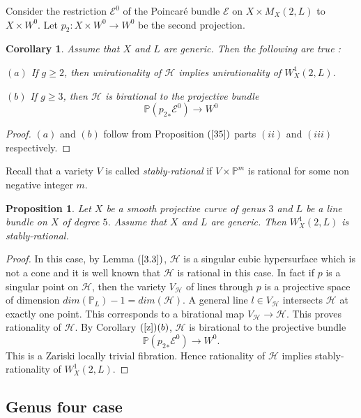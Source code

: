 \documentclass[12pt, reqno]{amsart}
\newtheorem{proposition}[theorem]{Proposition}
\newtheorem{corollary}[theorem]{Corollary}
\begin{document}
Consider the restriction $\mathcal{E}^{0}$ of the Poincar\'e bundle $\mathcal{E}$ on $X\times M_{X}(2,L)$ to $X\times W^{0}$. Let $p_{2}:X\times W^{0}\rightarrow W^{0}$ be the second projection. 
\begin{corollary}\label{z} 
Assume that $X$ and $L$ are generic. Then the following are true :

$(a)$ If $g\geq 2$, then unirationality of $\mathcal{H}$ implies unirationality of $W^{1}_{X}(2,L)$. 

$(b)$ If $g\geq 3$, then $\mathcal{H}$ is birational to the projective bundle 
    \[\mathbb{P}({p_{2}}_{*}\mathcal{E}^{0})\rightarrow W^{0}\]
\end{corollary}
\begin{proof}
    $(a)$ and $(b)$ follow from Proposition $(\ref{35})$ parts $(ii)$ and $(iii)$ respectively.
    \end{proof}

Recall that a variety $V$ is called {\it stably-rational} if $V\times \mathbb{P}^{m}$ is rational for some non negative integer $m$.
 \begin{proposition}\label{notcone}
       Let $X$ be a smooth projective curve of genus $3$ and $L$ be a line bundle on $X$ of degree $5$. Assume that $X$ and $L$ are generic. Then $W^{1}_{X}(2,L)$ is stably-rational.
    \end{proposition}
    \begin{proof}
        In this case, by Lemma $(\ref{3.3})$, $\mathcal{H}$ is a singular cubic hypersurface which is not a cone and it is well known that $\mathcal{H}$ is rational in this case.  In fact if $p$ is a singular point on $\mathcal{H}$, then the variety $V_{\mathcal{H}}$ of lines through $p$ is a projective space of dimension $dim(\mathbb{P}_L)-1 = dim(\mathcal{H})$. A general line $l\in V_{\mathcal{H}}$ intersects $\mathcal{H}$ at exactly one point. This corresponds to a birational map $V_{\mathcal{H}} \rightarrow \mathcal{H}$. This proves rationality of $\mathcal{H}$. By Corollary $(\ref{z})(b)$, $\mathcal{H}$ is birational to the projective bundle  
        \[\mathbb{P}({p_{2}}_{*}\mathcal{E}^{0})\rightarrow W^{0}.\]
This is a Zariski locally trivial fibration. Hence rationality of $\mathcal{H}$ implies stably-rationality of $W^{1}_{X}(2,L)$.       
    \end{proof}
    
    \subsection{Genus four case}
    
\end{document}
